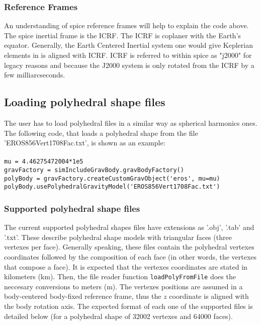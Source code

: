 \subsubsection{Reference Frames}
An understanding of spice reference frames will help to explain the code above. The spice inertial frame is the ICRF. The ICRF is coplaner with the Earth's equator. Generally, the Earth Centered Inertial system one would give Keplerian elements in is aligned with ICRF. ICRF is referred to within spice as "j2000" for legacy reasons and because the J2000 system is only rotated from the ICRF by a few milliarcseconds.

\subsection{Loading polyhedral shape files}

The user has to load polyhedral files in a similar way as spherical harmonics ones. The following code, that loads a polyhedral shape from the file 'EROS856Vert1708Fac.txt', is shown as an example: \\\\
\verb|mu = 4.46275472004*1e5|\\
\verb|gravFactory = simIncludeGravBody.gravBodyFactory()|\\
\verb|polyBody = gravFactory.createCustomGravObject('eros', mu=mu)|\\
\verb|polyBody.usePolyhedralGravityModel('EROS856Vert1708Fac.txt')|\\

\subsubsection{Supported polyhedral shape files}

The current supported polyhedral shapes files have extensions as '.obj', '.tab' and '.txt'. These describe polyhedral shape models with triangular faces (three vertexes per face). Generally speaking, these files contain the polyhedral vertexes coordinates followed by the composition of each face (in other words, the vertexes that compose a face). It is expected that the vertexes coordinates are stated in kilometers (km). Then, the file reader function \verb|loadPolyFromFile| does the neccesary conversions to meters (m). The vertexes positions are assumed in a body-centered body-fixed reference frame, thus the $z$ coordinate is aligned with the body rotation axis. The expected format of each one of the supported files is detailed below (for a polyhedral shape of 32002 vertexes and 64000 faces).\\

